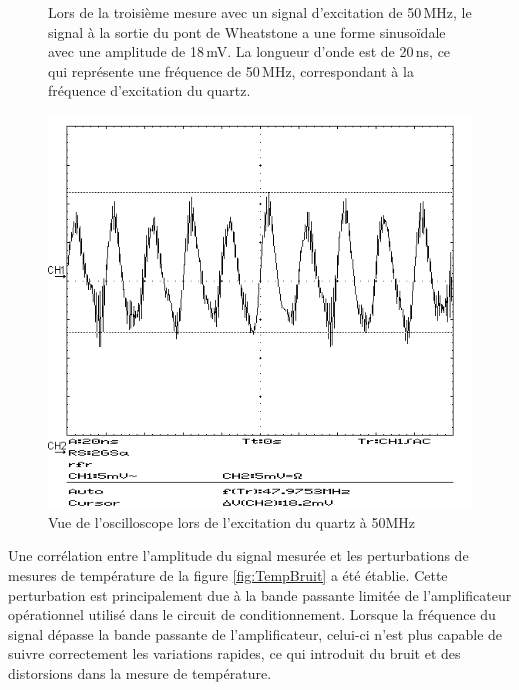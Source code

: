 \begin{figure}[H]
    \centering
    \begin{minipage}{0.48\textwidth}
        \small
        Lors de la troisième mesure avec un signal d'excitation de 50\,MHz, le signal à la sortie du pont de Wheatstone a une forme sinusoïdale avec une amplitude de 18\,mV.
        La longueur d'onde est de 20\,ns, ce qui représente une fréquence de 50\,MHz, correspondant à la fréquence d'excitation du quartz.
    \end{minipage}\hfill
    \begin{minipage}{0.48\textwidth}
        \centering
        \includegraphics[width=\textwidth]{assets/figures/SCR00008.png}
        \caption{Vue de l'oscilloscope lors de l'excitation du quartz à 50MHz}
        \label{fig:50mhzbruit}
    \end{minipage}
\end{figure}

Une corrélation entre l'amplitude du signal mesurée et les perturbations de mesures de température de la figure \ref{fig:TempBruit} a été établie.
Cette perturbation est principalement due à la bande passante limitée de l'amplificateur opérationnel utilisé dans le circuit de conditionnement. Lorsque la fréquence du signal dépasse la bande passante de l'amplificateur, celui-ci n'est plus capable de suivre correctement les variations rapides, ce qui introduit du bruit et des distorsions dans la mesure de température.

